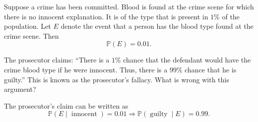\begin{example}
	Suppose a crime has been committed. Blood is found at the crime scene for which there is no innocent explanation. It is of the type that is present in $1\%$ of the population. Let $E$ denote the event that a person has the blood type found at the crime scene. Then
	\begin{equation}
		\mathbb{P}(E) = 0.01.
		\label{eq:proseca}
	\end{equation}
	
	The prosecutor claims: ``There is a $1\%$ chance that the defendant would have the crime blood type if he were innocent. Thus, there is a $99\%$ chance that he is guilty.'' This is known as the prosecutor's fallacy. What is wrong with this argument?\newline
	
	The prosecutor's claim can be written as
	\begin{equation}
		\mathbb{P}(E \mid \operatorname{innocent}) = 0.01 \Rightarrow \mathbb{P}(\operatorname{guilty} \mid E) = 0.99.
		\label{eq:prosec1}
	\end{equation}		
	

\end{example}
